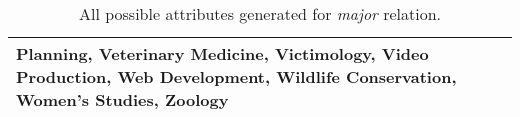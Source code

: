 \begin{table*}
{\begin{tabular}{lp{21cm}}
Planning, Veterinary Medicine, Victimology, Video Production, Web Development, Wildlife Conservation, Women's Studies, Zoology
            \\ \hline
        \end{tabular}
    }
    \caption{All possible attributes generated for \textit{major} relation.}
    \label{tab:major}
\end{table*}